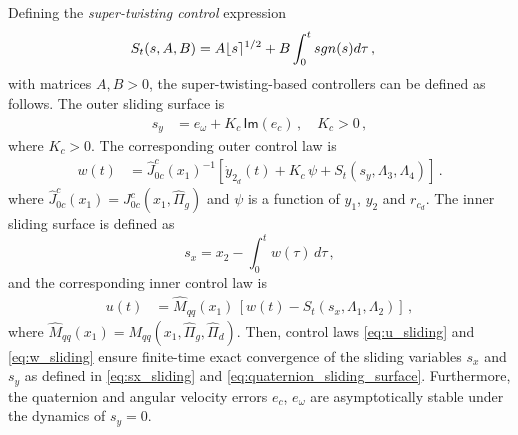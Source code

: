\begin{theorem}
Defining the {\it super-twisting control} expression
%
\begin{align}
S_t(s,A,B) &= A \lfloor s \rceil^{1/2} + B \int^{t}_{0}{sgn(s) d\tau} \,, \nonumber
\end{align}
%
with matrices $A, B > 0$, the super-twisting-based controllers can be defined as follows.
%
The outer sliding surface is
%
\begin{align}
s_{y} &= e_{\omega} + K_{c} \, \mathsf{Im}(e_{c}) \,, \quad K_{c} > 0 \,,
\label{eq:quaternion_sliding_surface}
\end{align}
%
where $K_c > 0$. The corresponding outer control law is
%
\begin{align}
w(t) &= \widehat{J}^{c}_{0c}(x_1)^{-1} \left[\dot{y}_{2_d}(t) \!+\! K_{c} \, \psi \!+\! S_t(s_y,\Lambda_3,\Lambda_4)\right] \,.
\label{eq:w_sliding}
\end{align}
%
where $\widehat{J}^{c}_{0c}(x_1) = J^{c}_{0c}(x_1,\widehat{\Pi}_g)$ and $\psi$ is a function of $y_1$, $y_2$ and $r_{c_d}$. 
%
The inner sliding surface is defined as
%
\begin{equation}
s_x = x_2 - \int^t_0{w(\tau)} \, d\tau\,,
\label{eq:sx_sliding}
\end{equation}
%
and the corresponding inner control law is
%
\begin{align}
u(t) &= \widehat{M}_{qq}(x_1) \, \left[ w(t) - S_t(s_x,\Lambda_1,\Lambda_2) \right] \,,
\label{eq:u_sliding}
\end{align}
%
where $\widehat{M}_{qq}(x_1) = M_{qq}(x_1,\widehat{\Pi}_g,\widehat{\Pi}_d)$.
%
Then, control laws \eqref{eq:u_sliding} and \eqref{eq:w_sliding} ensure finite-time exact convergence 
of the sliding variables $s_x$ and $s_y$ as defined in \eqref{eq:sx_sliding} and 
\eqref{eq:quaternion_sliding_surface}. Furthermore, the quaternion and angular velocity errors 		$e_c$, 
$e_\omega$ are asymptotically stable under the dynamics of $s_y = 0$. 
%

\end{theorem}
